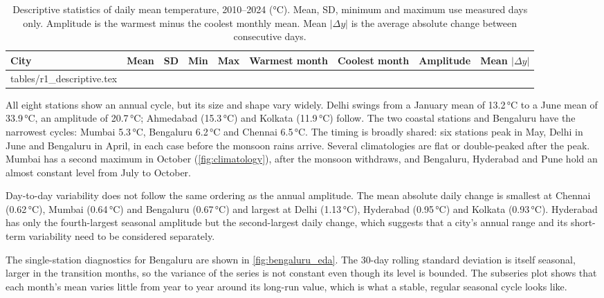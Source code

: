 \documentclass[11pt,a4paper]{article}
\makeatletter
\newcommand{\degC}{\,\si{\degreeCelsius}}
\newcommand{\tabfile}[1]{\@@input #1 }
\makeatother
\begin{document}
\begin{table}[ht]
\centering
\small
\caption{Descriptive statistics of daily mean temperature, 2010--2024 (\si{\degreeCelsius}). Mean, SD, minimum and maximum use measured days only. Amplitude is the warmest minus the coolest monthly mean. Mean $|\Delta y|$ is the average absolute change between consecutive days.}
\label{tab:descriptive}
\begin{tabular}{@{}l r r r r l l r r@{}}
\toprule
City & Mean & SD & Min & Max & Warmest month & Coolest month & Amplitude & Mean $|\Delta y|$ \\
\midrule
\tabfile{tables/r1_descriptive.tex}
\bottomrule
\end{tabular}
\end{table}

All eight stations show an annual cycle, but its size and shape vary widely. Delhi swings from a January mean of 13.2\degC{} to a June mean of 33.9\degC{}, an amplitude of 20.7\degC; Ahmedabad (15.3\degC) and Kolkata (11.9\degC) follow. The two coastal stations and Bengaluru have the narrowest cycles: Mumbai 5.3\degC, Bengaluru 6.2\degC{} and Chennai 6.5\degC. The timing is broadly shared: six stations peak in May, Delhi in June and Bengaluru in April, in each case before the monsoon rains arrive. Several climatologies are flat or double-peaked after the peak. Mumbai has a second maximum in October (\cref{fig:climatology}), after the monsoon withdraws, and Bengaluru, Hyderabad and Pune hold an almost constant level from July to October.

Day-to-day variability does not follow the same ordering as the annual amplitude. The mean absolute daily change is smallest at Chennai (0.62\degC), Mumbai (0.64\degC) and Bengaluru (0.67\degC) and largest at Delhi (1.13\degC), Hyderabad (0.95\degC) and Kolkata (0.93\degC). Hyderabad has only the fourth-largest seasonal amplitude but the second-largest daily change, which suggests that a city's annual range and its short-term variability need to be considered separately.

The single-station diagnostics for Bengaluru are shown in \cref{fig:bengaluru_eda}. The 30-day rolling standard deviation is itself seasonal, larger in the transition months, so the variance of the series is not constant even though its level is bounded. The subseries plot shows that each month's mean varies little from year to year around its long-run value, which is what a stable, regular seasonal cycle looks like.
\end{document}
